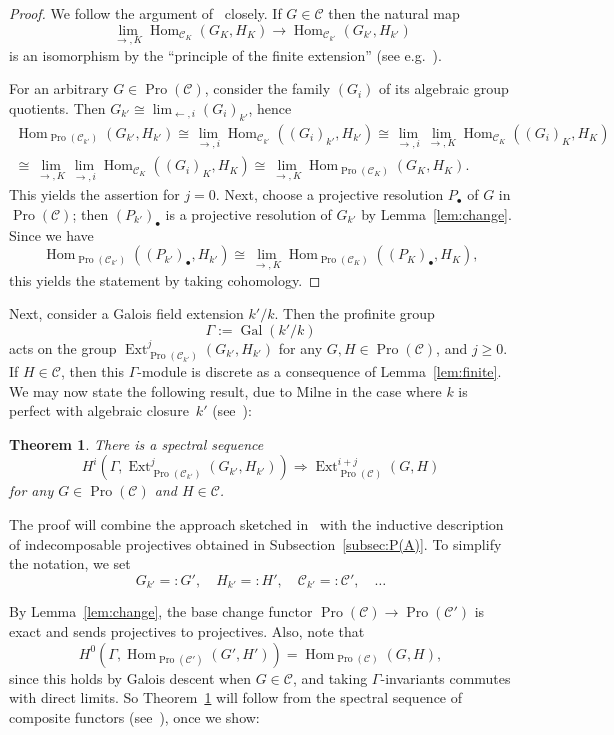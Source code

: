 \documentclass[11pt]{article}
\newtheorem{theo}{Theorem}[section]
\theoremstyle{definition}
\numberwithin{equation}{section}
\newcommand\cC{{\mathcal C}}
\DeclareMathOperator{\Ext}{Ext}
\DeclareMathOperator{\Gal}{Gal}
\DeclareMathOperator{\Hom}{Hom}
\DeclareMathOperator{\Pro}{Pro}
\theoremstyle{remark}
\begin{document}
\begin{proof}
We follow the argument of~\cite[V.3.2.3]{DG} closely. If $G \in \cC$ then the natural map
\[
\lim_{\to,K} \Hom_{\cC_K}(G_K,H_K)
\longrightarrow \Hom_{\cC_{k'}}(G_{k'},H_{k'})
\]
is an isomorphism by the ``principle of the finite extension'' (see e.g.~\cite[I.3.2.2]{DG}).

For an arbitrary $G \in \Pro(\cC)$, consider the family $(G_i)$ of its algebraic group quotients. Then $G_{k'} \cong \lim_{\leftarrow,i} (G_i)_{k'}$, hence
\begin{multline*}
\Hom_{\Pro(\cC_{k'})}(G_{k'},H_{k'})
\cong
\lim_{\to,i} \Hom_{\cC_{k'}}((G_i)_{k'},H_{k'})
\cong
\lim_{\to,i} \lim_{\to,K} \Hom_{\cC_K}((G_i)_K,H_K)
\\
\cong
\lim_{\to,K} \lim_{\to,i} \Hom_{\cC_K}((G_i)_K,H_K)
\cong
\lim_{\to,K} \Hom_{\Pro(\cC_K)}(G_K,H_K).
\end{multline*}
This yields the assertion for $j = 0$. Next, choose a projective resolution $P_{\bullet}$ of $G$ in $\Pro(\cC)$; then $(P_{k'})_{\bullet}$ is a projective resolution of $G_{k'}$ by Lemma~\ref{lem:change}. Since we have
\[
\Hom_{\Pro(\cC_{k'})}((P_{k'})_{\bullet}, H_{k'}) \cong
\lim_{\to,K} \Hom_{\Pro(\cC_K)}((P_K)_{\bullet}, H_K),
\]
this yields the statement by taking cohomology.
\end{proof}

Next, consider a Galois field extension $k'/k$. Then the profinite group
\[
\Gamma := \Gal(k'/k)
\]
acts on the group $\Ext^j_{\Pro(\cC_{k'})}(G_{k'}, H_{k'})$ for any $G,H \in \Pro(\cC)$, and $j \geq 0$. If $H \in \cC$, then this $\Gamma$-module is discrete as a consequence of Lemma~\ref{lem:finite}. We may now state the following result, due to Milne in the case where $k$ is perfect with algebraic closure~$k'$ (see~\cite[Prop., p.~437]{Milne}):

\begin{theo}\label{thm:milne}
There is a spectral sequence
\[
H^i(\Gamma, \Ext^j_{\Pro(\cC_{k'})}(G_{k'}, H_{k'}))
\Rightarrow \Ext^{i + j}_{\Pro(\cC)}(G, H)
\]
for any $G \in \Pro(\cC)$ and $H \in \cC$.
\end{theo}

The proof will combine the approach sketched in~\cite{Milne} with the inductive description of indecomposable projectives obtained in Subsection~\ref{subsec:P(A)}. To simplify the notation, we set
\[
G_{k'} =: G', \quad H_{k'} =: H', \quad \cC_{k'} =: \cC', \quad \ldots
\]

By Lemma~\ref{lem:change}, the base change functor $\Pro(\cC) \to \Pro(\cC')$ is exact and sends projectives to projectives. Also, note that
\[
H^0(\Gamma, \Hom_{\Pro(\cC')}(G', H')) = \Hom_{\Pro(\cC)}(G,H),
\]
since this holds by Galois descent when $G \in \cC$, and taking $\Gamma$-invariants commutes with direct limits. So Theorem~\ref{thm:milne} will follow from the spectral sequence of composite functors (see~\cite[Thm.~2.4.1]{Grothendieck}), once we show:
\end{document}
